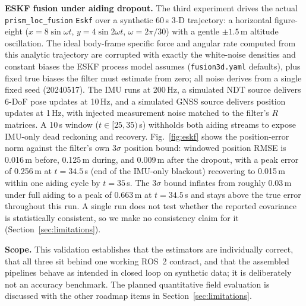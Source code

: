 \textbf{ESKF fusion under aiding dropout.}
The third experiment drives the actual \texttt{prism\_loc\_fusion}
\texttt{Eskf} over a synthetic 60\,s 3-D trajectory: a horizontal
figure-eight ($x = 8\sin\omega t$, $y = 4\sin 2\omega t$,
$\omega = 2\pi/30$) with a gentle $\pm 1.5$\,m altitude oscillation.
The ideal body-frame specific force and angular rate computed from this
analytic trajectory are corrupted with exactly the white-noise
densities and constant biases the ESKF process model assumes
(\texttt{fusion3d.yaml} defaults), plus fixed true biases the filter
must estimate from zero; all noise derives from a single fixed seed
(20240517). The IMU runs at 200\,Hz, a simulated NDT source delivers
6-DoF pose updates at 10\,Hz, and a simulated GNSS source delivers
position updates at 1\,Hz, with injected measurement noise matched to
the filter's $R$ matrices. A 10\,s window ($t \in [25, 35)$\,s)
withholds both aiding streams to expose IMU-only dead reckoning and
recovery. Fig.~\ref{fig:eskf} shows the position-error norm against the
filter's own $3\sigma$ position bound: windowed position RMSE is
0.016\,m before, 0.125\,m during, and 0.009\,m after the dropout, with
a peak error of 0.256\,m at $t = 34.5$\,s (end of the IMU-only
blackout) recovering to 0.015\,m within one aiding cycle by
$t = 35$\,s. The $3\sigma$ bound inflates from roughly 0.03\,m under
full aiding to a peak of 0.663\,m at $t = 34.5$\,s and stays above the
true error throughout this run. A single run does not test whether the
reported covariance is statistically consistent, so we make no
consistency claim for it (Section~\ref{sec:limitations}).



\textbf{Scope.}
This validation establishes that the estimators are individually
correct, that all three sit behind one working ROS~2 contract, and that
the assembled pipelines behave as intended in closed loop on synthetic
data; it is deliberately not an accuracy benchmark. The planned
quantitative field evaluation is discussed with the other roadmap items
in Section~\ref{sec:limitations}.

